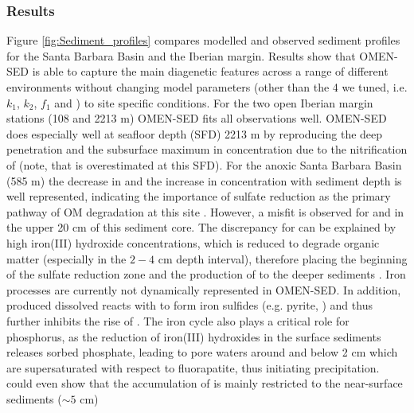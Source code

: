 \documentclass[gmd, manuscript]{copernicus}
\begin{document}
\subsubsection{Results}
Figure \ref{fig:Sediment_profiles} compares modelled and observed sediment profiles for the Santa Barbara Basin and the Iberian margin. Results show 
that OMEN-SED is able to capture the main diagenetic features across a range of different environments without changing model parameters (other than the 4 we tuned, i.e. $k_1$, $k_2$, $f_1$ and ) %
to site specific conditions. 
For the two open Iberian margin stations (108 and 2213 m) OMEN-SED fits all observations well. OMEN-SED does especially well at seafloor depth (SFD) 2213 m by reproducing the deep  penetration and the subsurface maximum in  
concentration due to the nitrification of  (note, that  is overestimated at this SFD). 
For the anoxic Santa Barbara Basin (585 m) the decrease in  and the increase in  concentration with sediment depth is well represented, indicating the 
importance of sulfate reduction as the primary pathway of OM degradation at this site \citep[compare with][]{meysman_reactive_2003}. 
However, a misfit is observed for  and  in the upper 20 cm of this sediment core. The discrepancy for  can be explained by high iron(III) hydroxide concentrations, 
which is reduced to degrade organic matter (especially in the $2-4$ cm depth interval), therefore placing the beginning of the sulfate reduction zone and the production of  to the deeper sediments \citep{reimers_porewater_1996}. 
Iron processes are currently not dynamically represented in OMEN-SED. 
In addition, produced dissolved  reacts with  to form iron sulfides (e.g. pyrite, ) and thus further inhibits the rise of  \citep{reimers_seasonal_1990}. 
The iron cycle also plays a critical role for phosphorus, as the reduction of iron(III) hydroxides in the surface sediments releases sorbed phosphate, leading to pore waters around and below 2 cm which are supersaturated with 
respect to fluorapatite, thus initiating  precipitation. \citet{reimers_porewater_1996} could even show that the accumulation of  is mainly restricted to the near-surface sediments ($\sim 5$ cm) 
\end{document}
